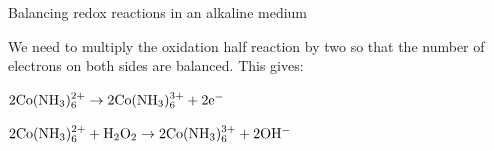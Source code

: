 \begin{wex}{Balancing redox reactions in an alkaline medium\\}
{We need to multiply the oxidation half reaction by two so that the number of electrons on both sides are balanced. This gives:

\begin{center}
$\rm{2Co(NH_{3})_{6}^{2+} \rightarrow 2Co(NH_{3})_{6}^{3+} + 2e^{-}}$\\
\end{center}

\begin{center}
$\rm{2Co(NH_{3})_{6}^{2+} + H_{2}O_{2} \rightarrow 2Co(NH_{3})_{6}^{3+} + 2OH^{-}}$\\
\end{center}
}
\end{wex}


